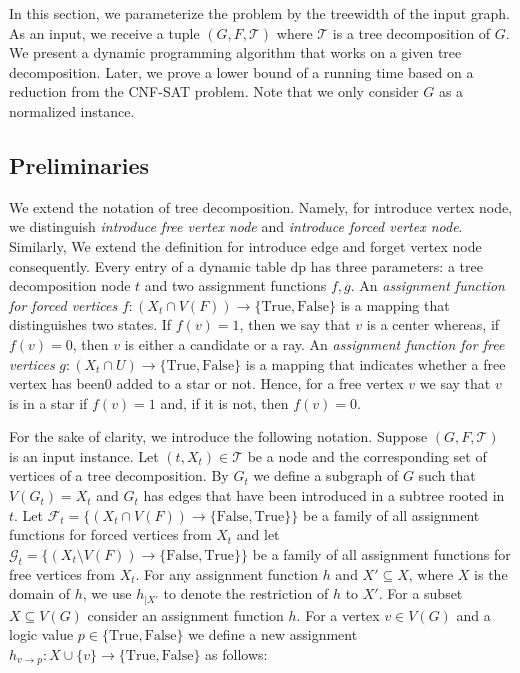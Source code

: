 \documentclass[en]{pracamgr}
\theoremstyle{definition}
\newcommand{\cnfsat}{{\sc CNF-SAT}}
\newcommand{\true}{\textrm{True}}
\newcommand{\false}{\textrm{False}}
\begin{document}
In this section, we parameterize the problem by the treewidth of the input graph. As an input, we receive a tuple $(G,F,\mathcal{T})$ where $\mathcal{T}$ is a tree decomposition of $G$. We present a dynamic programming algorithm that works on a given tree decomposition. Later, we prove a lower bound of a running time based on a reduction from the \cnfsat{} problem. Note that we only consider $G$ as a normalized instance.

\subsection{Preliminaries}

We extend the notation of tree decomposition. Namely, for introduce vertex node, we distinguish \textit{introduce free vertex node} and \textit{introduce forced vertex node}. Similarly, We extend the definition for introduce edge and forget vertex node consequently. Every entry of a dynamic table $\text{dp}$ has three parameters: a tree decomposition node $t$ and two assignment functions $f,g$. An \textit{assignment function for forced vertices} $f: (X_t \cap V(F)) \rightarrow \{\true, \false\}$ is a mapping that distinguishes two states. If $f(v)=1$, then we say that $v$ is a center whereas, if $f(v)=0$, then $v$ is either a candidate or a ray. An \textit{assignment function for free vertices} $g: (X_t \cap U) \rightarrow \{\true, \false\}$ is a mapping that indicates whether a free vertex has been0 added to a star or not. Hence, for a free vertex $v$ we say that $v$ is in a star if $f(v)=1$ and, if it is not, then $f(v)=0$.

For the sake of clarity, we introduce the following notation. Suppose $(G,F,\mathcal{T})$ is an input instance. Let $(t,X_t) \in \mathcal{T}$ be a node and the corresponding set of vertices of a tree decomposition. By $G_t$ we define a subgraph of $G$ such that $V(G_t) = X_t$ and $G_t$ has edges that have been introduced in a subtree rooted in $t$. Let $\mathcal{F}_t = \{(X_t \cap V(F)) \rightarrow \{\false,\true\}\}$ be a family of all assignment functions for forced vertices from $X_t$ and let $\mathcal{G}_t = \{(X_t \setminus V(F)) \rightarrow \{\false,\true\}\}$ be a family of all assignment functions for free vertices from $X_t$. For any assignment function $h$ and $X' \subseteq X$, where $X$ is the domain of $h$, we use $h_{|X'}$ to denote the restriction of $h$ to $X'$. For a subset $X \subseteq V(G)$ consider an assignment function $h$. For a vertex $v \in V(G)$ and a logic value $p \in \{\true, \false\}$ we define a new assignment $h_{v \rightarrow p}: X \cup \{v\} \rightarrow \{\true, \false\}$ as follows:
\end{document}
